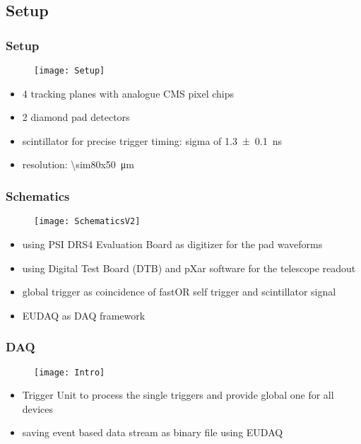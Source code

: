 \subsection{Setup}
\begin{frame}
	\frametitle{Setup}
	\begin{figure}
		\centering
		\texttt{[image: Setup]}
	\end{figure}
	\begin{itemize}
		\setlength{\itemsep}{\fill}
		\item 4 tracking planes with analogue CMS pixel chips
		\item 2 diamond pad detectors
		\item scintillator for precise trigger timing: sigma of \SI{1.3\pm.1}{ns}
		\item resolution: \SI{\sim80x50}{\micro\meter}
	\end{itemize}
\end{frame}
\begin{frame}
	\frametitle{Schematics}
	\begin{figure}
		\centering
		\texttt{[image: SchematicsV2]}
	\end{figure}
	\begin{itemize}
		\setlength{\itemsep}{\fill}
		\item using PSI DRS4 Evaluation Board as digitizer for the pad waveforms
		\item using Digital Test Board (DTB) and pXar software for the telescope readout
		\item global trigger as coincidence of fastOR self trigger and scintillator signal
		\item EUDAQ as DAQ framework
	\end{itemize}
\end{frame}
\begin{frame}
	\frametitle{DAQ}
	\begin{figure}
		\centering
		\texttt{[image: Intro]}
	\end{figure}
	\begin{itemize}
		\item Trigger Unit to process the single triggers and provide global one for all devices
		\item saving event based data stream as binary file using EUDAQ
	\end{itemize}
\end{frame}
